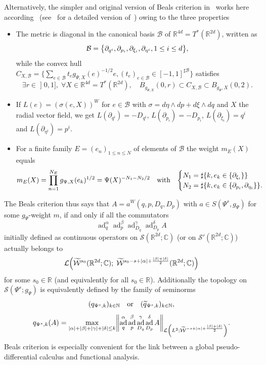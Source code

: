 \documentclass[10pt]{amsart}
\theoremstyle{definition}\newtheorem{defi}[theo]{Definition}\newtheorem{rema}[theo]{Remark}\newtheorem{exam}[theo]{Example}\newtheorem{exem}[theo]{Example}\newtheorem{nota}[theo]{Notation}
\newcommand{\C}{\mathbb{C}}
\newcommand{\R}{\mathbb{R}}
\newcommand{\N}{\mathbb{N}}
\newcommand{\clW}{\mathcal{W}}
\newcommand{\clS}{\mathcal{S}}
\newcommand{\clL}{\mathcal{L}}
\newcommand{\clB}{\mathcal{B}}
\DeclareMathOperator{\add}{ad}
\let\oldtilde\tilde
\renewcommand*{\tilde}[1]{\mathchoice{\widetilde{#1}}{\widetilde{#1}}{\oldtilde{#1}}{\oldtilde{#1}}}
\let\oldexists\exists
\renewcommand*{\exists}{\mathrel{\oldexists}}
\let\oldforall\forall
\renewcommand*{\forall}{\mathrel{\oldforall}}
\let\originalleft\left
\let\originalright\right
\renewcommand{\left}{\mathopen{}\mathclose\bgroup\originalleft}
\renewcommand{\right}{\aftergroup\egroup\originalright}
\begin{document}
Alternatively, the simpler and original version of Beals criterion in~\cite{Bea} works here according~\cite{BoCh} (see~\cite{NaNi} for a detailed version of~\cite[Remark~5.6]{BoCh}) owing to the three properties
\begin{itemize}
\item The metric is diagonal in the canonical basis $\clB$ of $\R^{4d}=T^*(\R^{2d})$, written as
\[
\clB=\left\{\partial_{q^{i}},\partial_{p_{i}}, \partial_{\xi_{i}},\partial_{\eta^{i}}, 1\leq i\leq d\right\},
\]
while the convex hull $C_{X,\clB}=\{\sum_{e\in \clB}t_{e}g_{\Psi,X}(e)^{-1/2}e, (t_{e})_{e\in \clB}\in[-1,1]^{\sharp \clB}\}$ satisfies
\[
\exists r\in\mathopen{]}0,1],\; \forall X\in \R^{4d}=T^{*}(\R^{2d}),\quad B_{g_{\Psi,X}}(0,r)\subset C_{X,\clB}\subset B_{g_{\Psi},X}(0,2).
\]
\item If $L(e)=(\sigma(e,X))^{W}$ for $e\in \clB$ with $\sigma = d\eta\wedge dp + d\xi\wedge dq$ and $X$ the radial vector field, we get $L(\partial_{q^{i}})=-D_{q^{i}}$, $L(\partial_{p_{i}})=-D_{p_{i}}$, $L(\partial_{\xi_{i}})=q^{i}$ and $L(\partial_{\eta^{i}})=p^{i}$.
\item For a finite family $E=(e_{n})_{1\leq n\leq N}$ of elements of $\clB$ the weight $m_{E}(X)$ equals
\[
m_{E}(X)=\prod_{n=1}^{N_{E}}g_{\Psi,X}(e_{k})^{1/2}=\Psi(X)^{-N_{1}-N_{2}/2} \quad\text{with}\quad
\begin{cases}
N_{1}=\sharp\left\{k, e_{k}\in \left\{\partial_{\xi_{i}}\right\}\right\}\\
N_{2}=\sharp\left\{k, e_{k}\in \left\{\partial_{p_{i}},\partial_{\eta_{i}}\right\}\right\}.
\end{cases}
\]
\end{itemize}
The Beals criterion thus says that $A=a^{W}(q,p,D_{q},D_{p})$ with $a\in S(\Psi^{s},g_{\Psi})$ for some $g_{\Psi}$-weight $m$, if and only if all the commutators
\[
\add_{q}^{\alpha}\add_{p}^{\beta}\add_{D_{q}}^{\gamma}\add_{D_{p}}^{\delta}A
\]
initially defined as continuous operators on $\clS(\R^{2d};\C)$ (or on $\clS'(\R^{2d};\C)$) actually belongs to
\[
\clL\left(\tilde{\clW}^{s_{0}}(\R^{2d};\C);\;\tilde{\clW}^{s_{0}-s+|\alpha|+\frac{|\beta|+|\delta|}{2}}(\R^{2d};\C)\right)
\]
for some $s_{0}\in \R$ (and equivalently for all $s_{0}\in \R$). Additionally the topology on $\clS(\Psi^{s}; g_{\Psi})$ is equivalently defined by the family of seminorms
\[
(q_{\Psi^{s},k})_{k\in \N} \quad\text{or}\quad (\tilde{q}_{\Psi^{s}, k})_{k\in\N},
\]
\[
q_{\Psi^{s},k}(A)=\max_{|\alpha|+|\beta|+|\gamma|+|\delta|\leq k}\left\|\add_{q}^{\alpha}\add_{p}^{\beta}\add_{D_{q}}^{\gamma}\add_{D_{p}}^{\delta}A\right\|_{\clL\left(L^{2};\widetilde{\clW}^{-s+|\alpha|+\frac{|\beta|+|\delta|}{2}}\right)}.
\]
Beals criterion is especially convenient for the link between a global pseudo-differen\-tial calculus and functional analysis.
\end{document}
